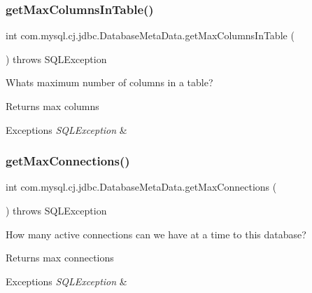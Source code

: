 \subsubsection{\texorpdfstring{get\+Max\+Columns\+In\+Table()}{getMaxColumnsInTable()}}
{\footnotesize\ttfamily int com.\+mysql.\+cj.\+jdbc.\+Database\+Meta\+Data.\+get\+Max\+Columns\+In\+Table (\begin{DoxyParamCaption}{ }\end{DoxyParamCaption}) throws S\+Q\+L\+Exception}

What\textquotesingle{}s maximum number of columns in a table?

\begin{DoxyReturn}{Returns}
max columns 
\end{DoxyReturn}

\begin{DoxyExceptions}{Exceptions}
{\em S\+Q\+L\+Exception} & \\
\hline
\end{DoxyExceptions}
\mbox{\label{classcom_1_1mysql_1_1cj_1_1jdbc_1_1_database_meta_data_a32625ff8d735d95f5504d6a6a0650b3a}} 
\subsubsection{\texorpdfstring{get\+Max\+Connections()}{getMaxConnections()}}
{\footnotesize\ttfamily int com.\+mysql.\+cj.\+jdbc.\+Database\+Meta\+Data.\+get\+Max\+Connections (\begin{DoxyParamCaption}{ }\end{DoxyParamCaption}) throws S\+Q\+L\+Exception}

How many active connections can we have at a time to this database?

\begin{DoxyReturn}{Returns}
max connections 
\end{DoxyReturn}

\begin{DoxyExceptions}{Exceptions}
{\em S\+Q\+L\+Exception} & \\
\hline
\end{DoxyExceptions}
\mbox{\label{classcom_1_1mysql_1_1cj_1_1jdbc_1_1_database_meta_data_a2b6f44e542d7d900cd2f7176bdeee045}} 
